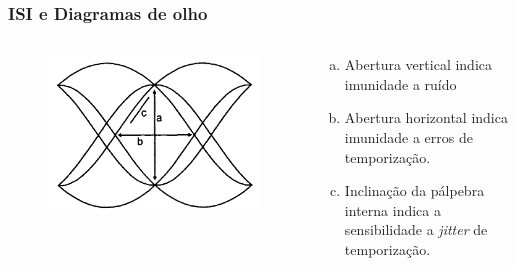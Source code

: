 \begin{frame}
	\frametitle{ISI e Diagramas de olho}

	\begin{columns}	
	    \begin{column}{0.5\textwidth}
		\begin{figure}[t]	
		    \begin{center}
			\includegraphics[width=0.8\columnwidth]{figs/pam_11}
		    \end{center}
		\end{figure}
	    \end{column}

	    \begin{column}{0.5\textwidth}
		\begin{enumerate}[a)]
		    \item Abertura vertical indica imunidade a ruído
		    \item Abertura horizontal indica imunidade a erros de temporização.
		    \item Inclinação da pálpebra interna indica a sensibilidade a \textit{jitter} de temporização.
		\end{enumerate}		 
	    \end{column}	
	\end{columns}

\end{frame}

